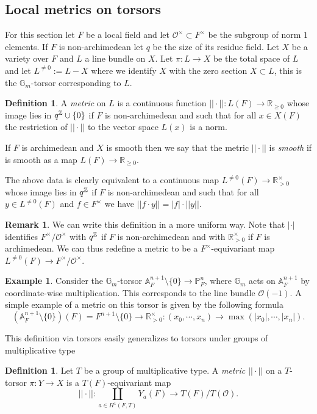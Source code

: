 \documentclass[a4paper,11pt,reqno]{amsart}
\newcommand{\R}{\mathbb{R}}
\newcommand{\G}{\mathbb{G}}
\newcommand{\A}{\mathbb{A}}
\newcommand{\Proj}{\mathbb{P}}
\theoremstyle{definition}
\newtheorem{definition}[theorem]{Definition}
\newtheorem{example}[theorem]{Example}
\newtheorem{remark}[theorem]{Remark}
\begin{document}
\subsection{Local metrics on torsors}
For this section let $F$ be a local field and let $\mathcal{O}^{\times} \subset F^{\times}$ be the subgroup of norm $1$ elements. If $F$ is non-archimedean let $q$ be the size of its residue field. Let $X$ be a variety over $F$ and $L$ a line bundle on $X$. Let $\pi: L \to X$ be the total space of $L$ and let $L^{\neq 0} := L - X$ where we identify $X$ with the zero section $X \subset L$, this is the $\G_m$-torsor corresponding to $L$. 
\begin{definition}
	A \emph{metric} on $L$ is a continuous function $|| \cdot ||: L(F) \to \R_{\geq 0}$ whose image lies in $q^{\mathbb{Z}} \cup \{ 0\}$ if $F$ is non-archimedean and such that for all $x \in X(F)$ the restriction of $|| \cdot ||$ to the vector space $L(x)$ is a norm. 
	
	If $F$ is archimedean and $X$ is smooth then we say that the metric $|| \cdot ||$ is \emph{smooth} if is smooth as a map $L(F) \to \R_{\geq 0}$.
		
	The above data is clearly equivalent to a continuous map $L^{\neq 0} (F) \to \R_{>0}^{\times}$ whose image lies in $q^{\mathbb{Z}}$ if $F$ is non-archimedean and such that for all $y \in L^{\neq 0} (F)$ and $f \in F^{\times}$ we have $||f \cdot y|| = |f| \cdot || y||$.
\end{definition}
\begin{remark}
	We can write this definition in a more uniform way. Note that $|\cdot|$ identifies $F^{\times}/\mathcal{O}^{\times}$ with $q^{\mathbb{Z}}$ if $F$ is non-archimedean and with $\R_{>0}^{\times}$ if $F$ is archimedean. We can thus redefine a metric to be a $F^{\times}$-equivariant map $L^{\neq 0} (F) \to F^{\times}/\mathcal{O}^{\times}$.
\end{remark}
\begin{example}
	Consider the $\G_m$-torsor $\A^{n + 1}_F \setminus \{0\} \to \Proj^n_F$, where $\G_m$ acts on $\A^{n + 1}_F$ by coordinate-wise multiplication. This corresponds to the line bundle $\mathcal{O}(-1)$. A simple example of a metric on this torsor is given by the following formula
	\begin{equation*}
		(\A^{n + 1}_F \setminus \{0\})(F) =F^{n + 1} \setminus \{0\} \to \R_{>0}^{\times}: (x_0, \cdots, x_n) \to \max(|x_0|, \cdots, |x_n|).
	\end{equation*}
\end{example}
This definition via torsors easily generalizes to torsors under groups of multiplicative type
\begin{definition}
	Let $T$ be a group of multiplicative type. A \emph{metric $||\cdot||$} on a $T$-torsor $\pi: Y \to X$ is a $T(F)$-equivariant map 
	\begin{equation*}
		||\cdot||: \coprod_{a \in H^1(F, T)} Y_{a}(F) \to T(F)/T(\mathcal{O}).
	\end{equation*} 
\end{definition}
\end{document}
